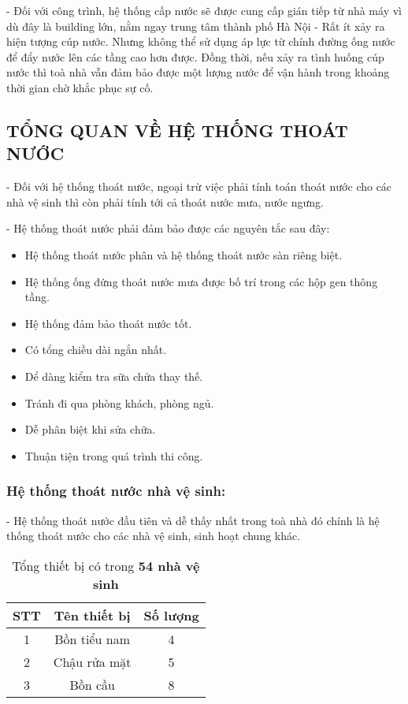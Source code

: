 		- Đối với công trình, hệ thống cấp nước sẽ được cung cấp gián tiếp từ nhà máy vì dù đây là building lớn, nằm ngay trung tâm thành phố Hà Nội - Rất ít xảy ra hiện tượng cúp nước. Nhưng không thể sử dụng áp lực từ chính đường ống nước để đẩy nước lên các tầng cao hơn được. Đồng thời, nếu xảy ra tình huống cúp nước thì toà nhà vẫn đảm bảo được một lượng nước để vận hành trong khoảng thời gian chờ khắc phục sự cố.
		
	\subsection{TỔNG QUAN VỀ HỆ THỐNG THOÁT NƯỚC}
	- Đối với hệ thống thoát nước, ngoại trừ việc phải tính toán thoát nước cho các nhà vệ sinh thì còn phải tính tới cả thoát nước mưa, nước ngưng.
	
	- Hệ thống thoát nước phải đảm bảo được các nguyên tắc sau đây:
	\begin{itemize}[leftmargin=2.2cm]
		\setlength\itemsep{1mm}
		\item Hệ thống thoát nước phân và hệ thống thoát nước sàn riêng biệt. 
		\item Hệ thống ống đứng thoát nước mưa được bố trí trong các hộp gen thông tầng.
		\item Hệ thống đảm bảo thoát nước tốt. 
		\item Có tổng chiều dài ngắn nhất. 
		\item Dể dàng kiểm tra sữa chửa thay thế. 
		\item Tránh đi qua phòng khách, phòng ngủ. 
		\item Dễ phân biệt khi sửa chữa. 
		\item Thuận tiện trong quá trình thi công. 
	\end{itemize}
	\subsubsection{Hệ thống thoát nước nhà vệ sinh:}	
	- Hệ thống thoát nước đầu tiên và dễ thấy nhất trong toà nhà đó chính là hệ thống thoát nước cho các nhà vệ sinh, sinh hoạt chung khác.
	
\begin{table}[H]
		\vspace{-0.5cm}
  		\centering
  		\caption{Tổng thiết bị có trong \textbf{54 nhà vệ sinh}}
    	\begin{tabular}{|c|c|c|}
    	\hline
    	\multicolumn{1}{|c|}{\textbf{STT}} & \multicolumn{1}{c|}{\textbf{Tên thiết bị}} & \multicolumn{1}{c|}{\textbf{Số lượng}} \\
    	\hline
    	1     & Bồn tiểu nam & 4 \\
    	\hline
    	2     & Chậu rửa mặt & 5 \\
    	\hline
    	3     & Bồn cầu & 8 \\
   	 	\hline
    	\end{tabular}%
  		\label{tab:tong_thoat_nvs}
\end{table}
	 
